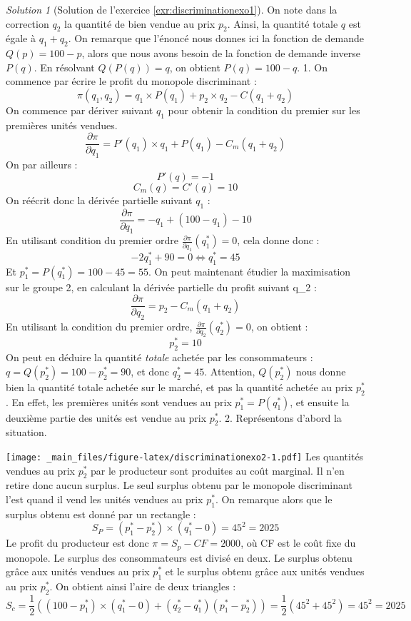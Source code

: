 \documentclass[
]{book}
\theoremstyle{definition}
\theoremstyle{definition}
\theoremstyle{definition}
\theoremstyle{definition}
\theoremstyle{remark}
\newtheorem*{solution}{Solution}
\begin{document}
\begin{solution}[Solution de l'exercice \ref{exr:discriminationexo1}]

On note dans la correction \(q_2\) la quantité de bien vendue au prix \(p_2\).
Ainsi, la quantité totale \(q\) est égale à \(q_1+q_2\).
On remarque que l'énoncé nous donnes ici la fonction de demande \(Q(p)=100-p\), alors que nous avons besoin de la fonction de demande inverse \(P(q)\).
En résolvant \(Q(P(q))=q\), on obtient \(P(q)=100-q\).
1. On commence par écrire le profit du monopole discriminant :
\[\pi(q_1, q_2)=q_1\times P(q_1)+p_2\times q_2-C(q_1+q_2)\]
On commence par dériver suivant \(q_1\) pour obtenir la condition du premier sur les premières unités vendues.
\[\frac{\partial \pi}{\partial q_1}=P'(q_1)\times q_1+P(q_1)-C_m(q_1+q_2)\]
On par ailleurs :
\[P'(q)=-1\]
\[C_m(q)=C'(q)=10\]
On réécrit donc la dérivée partielle suivant \(q_1\) :
\[\frac{\partial \pi}{\partial q_1}=-q_1+(100-q_1)-10\]
En utilisant condition du premier ordre \(\frac{\partial \pi}{\partial q_1}(q_1^*)=0\), cela donne donc :
\[-2q_1^*+90=0\Leftrightarrow q_1^*=45\]
Et \(p_1^*=P(q_1^*)=100-45=55\).
On peut maintenant étudier la maximisation sur le groupe 2, en calculant la dérivée partielle du profit suivant q\_2 :
\[\frac{\partial \pi}{\partial q_2}=p_2-C_m(q_1+q_2)\]
En utilisant la condition du premier ordre, \(\frac{\partial \pi}{\partial q_2}(q_2^*)=0\), on obtient :
\[p_2^*=10\]
On peut en déduire la quantité \emph{totale} achetée par les consommateurs :
\(q=Q(p_2^*)=100-p_2^*=90\), et donc \(q_2^*=45\).
Attention, \(Q(p_2^*)\) nous donne bien la quantité totale achetée sur le marché, et pas la quantité achetée au prix \(p_2^*\).
En effet, les premières unités sont vendues au prix \(p_1^*=P(q_1^*)\), et ensuite la deuxième partie des unités est vendue au prix \(p_2^*\).
2. Représentons d'abord la situation.

\texttt{[image: \_main\_files/figure-latex/discriminationexo2-1.pdf]}
Les quantités vendues au prix \(p_2^*\) par le producteur sont produites au coût marginal.
Il n'en retire donc aucun surplus.
Le seul surplus obtenu par le monopole discriminant l'est quand il vend les unités vendues au prix \(p_1^*\).
On remarque alors que le surplus obtenu est donné par un rectangle :
\[S_P=(p_1^*-p_2^*)\times(q_1^*-0)=45^2=2025\]
Le profit du producteur est donc \(\pi=S_p-CF=2000\), où CF est le coût fixe du monopole.
Le surplus des consommateurs est divisé en deux.
Le surplus obtenu grâce aux unités vendues au prix \(p_1^*\) et le surplus obtenu grâce aux unités vendues au prix \(p_2^*\).
On obtient ainsi l'aire de deux triangles :
\[S_c=\frac{1}{2}\left((100-p_1^*)\times(q_1^*-0)+(q_2^*-q_1^*)(p_1^*-p_2^*)\right)=\frac{1}{2}(45^2+45^2)=45^2=2025\]


\end{solution}
\end{document}
